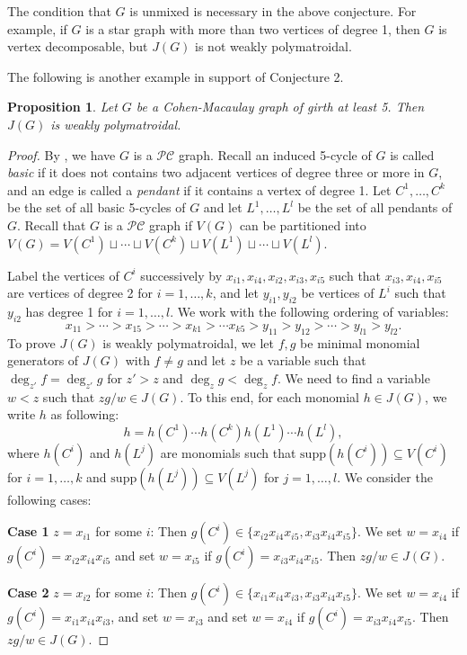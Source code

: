 \documentclass[12pt]{amsart}
\newtheorem{Proposition}[Theorem]{Proposition}
\begin{document}
The condition that $G$ is unmixed is necessary in the above conjecture. For example, if $G$ is a star graph with more than two vertices of degree 1, then $G$ is vertex decomposable, but $J(G)$ is not  weakly polymatroidal.


The following is another example in support of Conjecture 2.
\begin{Proposition} \label{3.5} Let $G$ be a Cohen-Macaulay graph of girth at least 5. Then $J(G)$ is weakly polymatroidal.
\end{Proposition}
\begin{proof} By \cite[Theorem 2.4]{HMT},  we have $G$ is a $\mathcal{PC}$ graph. Recall an induced 5-cycle of  $G$ is called {\it basic} if it does not contains two adjacent vertices of degree three or more in $G$, and an edge is called a {\it pendant} if it contains a vertex of degree 1.   Let $C^1, \ldots, C^k$ be the set of all basic 5-cycles of $G$ and let $L^1,\ldots,L^l$ be the set of all pendants of $G$.  Recall that $G$ is a $\mathcal{PC}$ graph if $V(G)$ can be partitioned into $V(G)=V(C^1)\sqcup \cdots \sqcup V(C^k)\sqcup  V(L^1)\sqcup \cdots \sqcup V(L^l)$.

Label the  vertices of $C^{i}$ successively by $x_{i1}, x_{i4}, x_{i2}, x_{i3}, x_{i5}$ such that $x_{i3},x_{i4}, x_{i5}$ are vertices of degree 2 for $i=1,\ldots,k$, and let $y_{i1}, y_{i2}$ be vertices of $L^i$ such that $y_{i2}$  has degree 1 for $i=1,\ldots,l$. We work with the following ordering of variables:
$$x_{11}>\cdots >x_{15}>\cdots>x_{k1}>\cdots x_{k5}>y_{11}>y_{12}>\cdots>y_{l1}>y_{l2}.$$
To prove $J(G)$ is weakly polymatroidal, we let $f,g$ be minimal monomial generators of $J(G)$ with $f\neq g$ and let $z$ be a variable such that $\deg_{z'}f=\deg_{z'}g$ for $z'>z$ and $\deg_{z}g<\deg_{z}f$. We need to find a variable $w<z$ such that $zg/w\in J(G)$. To this end, for each monomial $h\in J(G)$,  we write $h$ as following: $$h=h(C^1)\cdots h(C^k)h(L^1)\cdots h(L^l),$$ where $h(C^i)$ and $h(L^j)$ are monomials such that $\mathrm{supp}(h(C^i))\subseteq V(C^i)$ for $i=1,\ldots,k$ and $\mathrm{supp}(h(L^j))\subseteq V(L^j)$ for $j=1,\ldots,l$.   We consider the following cases:

{\bf Case 1} $z=x_{i1}$ for some $i$: Then $g(C^i)\in \{x_{i2}x_{i4}x_{i5}, x_{i3}x_{i4}x_{i5}\}$. We set $w=x_{i4}$ if $g(C^i)=x_{i2}x_{i4}x_{i5}$ and  set $w=x_{i5}$ if $g(C^i)=x_{i3}x_{i4}x_{i5}$. Then $zg/w\in J(G)$.

{\bf Case 2} $z=x_{i2}$ for some $i$: Then $g(C^i)\in \{x_{i1}x_{i4}x_{i3}, x_{i3}x_{i4}x_{i5}\}$. We set $w=x_{i4}$  if $g(C^i)=x_{i1}x_{i4}x_{i3}$, and set $w=x_{i3}$ and  set $w=x_{i4}$ if $g(C^i)=x_{i3}x_{i4}x_{i5}$. Then $zg/w\in J(G)$.



\end{proof}
\end{document}
